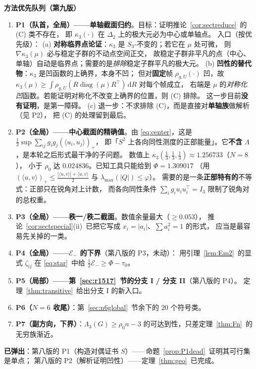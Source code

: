 \documentclass[UTF8,11pt]{ctexart}
\theoremstyle{definition}
\newcommand{\Lam}{\Lambda}
\newcommand{\dd}{\,\mathrm{d}}
\begin{document}
\textbf{方法优先队列（第九版）}
\begin{enumerate}\itemsep3pt
\item \textbf{P1（队首，全局）——单轴截面归约}。目标：证明推论~\ref{cor:sectreduce}~的 (C) 类不存在，
即 $\kappa_3(\cdot)$ 在 $\Delta_2$ 上的极大元必为中心或单轴点。
入口（按优先级）：
(a) \textbf{对称临界点论证}：$\kappa_3$ 是 $S_3$-不变的；若它在 $\mu$ 处可微，
则 $\nabla\kappa_3(\mu)$ 必与稳定子群的不动点空间正交，
故稳定子群非平凡的点（中心、单轴）自动是临界点；需要的是\emph{排除}稳定子群平凡的极大元。
(b) \textbf{凹性的替代物}：$\kappa_3$ 是凹函数的上确界，本身不凹；
但对\textbf{固定}帧 $\rho_{g,U}(\cdot)$ 凹，故
$\kappa_3(\mu)\ge\int\rho_{g,U}(R\operatorname{diag}(\mu)R^\top)\dd R$ 对每个帧成立，
右端是 $\mu$ 的\emph{对称化凹}函数。若能证明对称化不改变上确界的位置，则 (C) 排除。
这一步目前\textbf{没有证明}，是第一障碍。
(c) 退一步：不求排除 (C)，而是直接对\textbf{单轴族}做解析（见 P2），
把 (C) 的处理留到最后。
\item \textbf{P2（全局）——中心截面的精确值}。由 \eqref{eq:center}，这是
$\frac13\sup\sum_{ij}g_ig_j(\langle u_i,u_j\rangle)_+$，
即「$S^2$ 上各向同性测度的正部能量」。它\textbf{不含} $\Lam$，是本轮之后形式最干净的子问题。
数值上 $\kappa_3(\frac13,\frac13,\frac13)\approx1.256733$（$N=8$），
小于 $\rho_0$ 达 $0.024836$。已知工具只能给到 $\Phi=1.309017$
（用 $(\langle u,v\rangle)_+\le\frac{|\langle u,v\rangle|+\langle u,v\rangle}2$ 与 $\lambda_{\max}(|Q|)\le\varphi$）。
需要的是一条\textbf{正部特有的}不等式：正部只在锐角对上计数，
而各向同性条件 $\sum_ig_iu_iu_i^\top=I_3$ 限制了锐角对的总权重。
\item \textbf{P3（全局）——秩一/秩二截面}。数值余量最大（$\ge0.053$），
推论~\ref{cor:sectspecial}(ii)~已把它写成 $x_i=|a_i|$、$\sum a_i^2=1$ 的形式，
应当是最容易先关掉的一类。
\item \textbf{P4（全局）——$\mathcal E_-$ 的下界}（第八版的 P3，未动）：
用引理~\ref{lem:Em2}~的显式 $\zeta_{ij}$ 在 \eqref{eq:star}~中给 $\frac12\mathcal E_-\ge\Phi-\tau_0$。
\item \textbf{P5（局部）——第~\ref{sec:r1517}~节的分支 I / 分支 II}（第八版的 P4）。
定理~\ref{thm:transitive}~给出分支 I 的新入口。
\item \textbf{P6（$N=6$ 收尾）}：第~\ref{sec:n6global}~节余下的 $20$ 个符号类。
\item \textbf{P7（副方向，下界）}：$\Lam_3(G)\ge\rho_0n-3$ 的可达到性，只差定理~\ref{thm:Fn}~的无穷族渐近。
\end{enumerate}

\textbf{已弹出}：第八版的 P1（构造对偶证书 $S$）——命题~\ref{prop:P1dead}~证明其可行集是单点；
第八版的 P2（解析证明凹性）——定理~\ref{thm:geo}~已完成。
\end{document}
